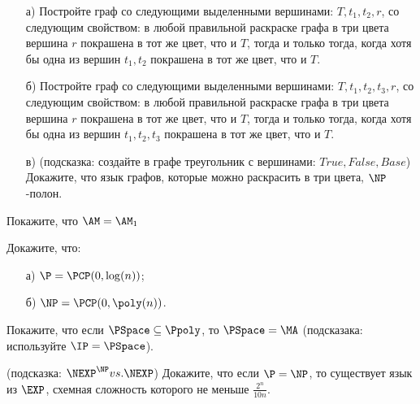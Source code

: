 

\begin{task}
    \begin{enumerate}[topsep = 0pt, itemsep = -1ex]
        \item [а)] Постройте граф со следующими выделенными вершинами: $T, t_1, t_2, r$, со следующим свойством: в любой
            правильной раскраске графа в три цвета вершина $r$ покрашена в тот же цвет, что и $T$, тогда и только тогда,
            когда хотя бы одна из вершин $t_1, t_2$ покрашена в тот же цвет, что и $T$.
        \item [б)] Постройте граф со следующими выделенными вершинами: $T, t_1, t_2, t_3, r$, со следующим свойством: в любой
            правильной раскраске графа в три цвета вершина $r$ покрашена в тот же цвет, что и $T$, тогда и только тогда, когда
            хотя бы одна из вершин $t_1, t_2, t_3$ покрашена в тот же цвет, что и $T$.
        \item [в)] (подсказка: создайте в графе треугольник с вершинами: $True, False, Base$) Докажите, что язык графов,
            которые можно раскрасить в три цвета, $\NP$-полон.
    \end{enumerate}
\end{task}

\begin{task}
    Покажите, что $\AM = \AM_1$
\end{task}

\begin{task}
    Докажите, что:
    \begin{enumerate}[topsep = 0pt, itemsep = -1ex]
        \item [а)] $\P = \PCP(0, \log(n))$;
        \item [б)] $\NP = \PCP(0, \poly(n))$.
    \end{enumerate}
\end{task}


\begin{task}
    Покажите, что если $\PSpace \subseteq \Ppoly$, то $\PSpace = \MA$ (подсказака: используйте $\IP = \PSpace$).
\end{task}

\breakline

\begin{ptask}{26}(подсказка: $\NEXP^{\NP} vs. \NEXP$)
    Докажите, что если $\P = \NP$, то существует язык из $\EXP$, схемная сложность которого не меньше $\frac{2^n}{10 n}$.
\end{ptask}


